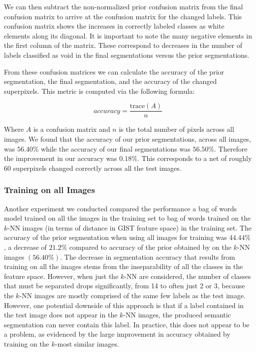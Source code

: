 \documentclass{article} %
\begin{document}
We can then subtract the non-normalized prior confusion matrix from the final confusion matrix to arrive at the confusion matrix for the changed labels. This confusion matrix shows the increases in correctly labeled classes as white elements along its diagonal. It is important to note the many negative elements in the first column of the matrix. These correspond to decreases in the number of labels classified as void in the final segmentations versus the prior segmentations.

From these confusion matrices we can calculate the accuracy of the prior segmentation, the final segmentation, and the accuracy of the changed superpixels. This metric is computed via the following formula:

\begin{equation}
	accuracy = \frac{\mathrm{trace}(A)}{n}
\end{equation}

Where $A$ is a confusion matrix and $n$ is the total number of pixels across all images. We found that the accuracy of our prior segmentations, across all images, was $56.40\%$ while the accuracy of our final segmentations was $56.50\%$. Therefore the improvement in our accuracy was $0.18\%$. This corresponds to a net of roughly 60 superpixels changed correctly across all the test images.

\subsubsection{Training on all Images}
\label{sec:trainAll}
Another experiment we conducted compared the performance a bag of words model trained on all the images in the training set to bag of words trained on the $k$-NN images (in terms of distance in GIST feature space) in the training set. The accuracy of the prior segmentation when using all images for training was $44.44\%$, a decrease of $21.2\%$ compared to accuracy of the prior obtained by on the $k$-NN images $(56.40\%)$. The decrease in segmentation accuracy that results from training on all the images stems from the inseparability of all the classes in the feature space. However, when just the $k$-NN are considered, the number of classes that must be separated drops significantly, from 14 to often just 2 or 3, because the $k$-NN images are mostly comprised of the same few labels as the test image. However, one potential downside of this approach is that if a label contained in the test image does not appear in the $k$-NN images, the produced semantic segmentation can never contain this label. In practice, this does not appear to be a problem, as evidenced by the large improvement in accuracy obtained by training on the $k$-most similar images.
\end{document}

